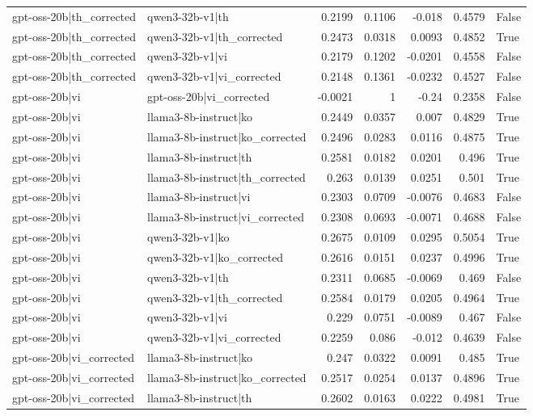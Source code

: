 \begin{table}
\begin{tabular}{l l r r r r l}
gpt-oss-20b|th_corrected & qwen3-32b-v1|th & 0.2199 & 0.1106 & -0.018 & 0.4579 & False \\
gpt-oss-20b|th_corrected & qwen3-32b-v1|th_corrected & 0.2473 & 0.0318 & 0.0093 & 0.4852 & True \\
gpt-oss-20b|th_corrected & qwen3-32b-v1|vi & 0.2179 & 0.1202 & -0.0201 & 0.4558 & False \\
gpt-oss-20b|th_corrected & qwen3-32b-v1|vi_corrected & 0.2148 & 0.1361 & -0.0232 & 0.4527 & False \\
gpt-oss-20b|vi & gpt-oss-20b|vi_corrected & -0.0021 & 1 & -0.24 & 0.2358 & False \\
gpt-oss-20b|vi & llama3-8b-instruct|ko & 0.2449 & 0.0357 & 0.007 & 0.4829 & True \\
gpt-oss-20b|vi & llama3-8b-instruct|ko_corrected & 0.2496 & 0.0283 & 0.0116 & 0.4875 & True \\
gpt-oss-20b|vi & llama3-8b-instruct|th & 0.2581 & 0.0182 & 0.0201 & 0.496 & True \\
gpt-oss-20b|vi & llama3-8b-instruct|th_corrected & 0.263 & 0.0139 & 0.0251 & 0.501 & True \\
gpt-oss-20b|vi & llama3-8b-instruct|vi & 0.2303 & 0.0709 & -0.0076 & 0.4683 & False \\
gpt-oss-20b|vi & llama3-8b-instruct|vi_corrected & 0.2308 & 0.0693 & -0.0071 & 0.4688 & False \\
gpt-oss-20b|vi & qwen3-32b-v1|ko & 0.2675 & 0.0109 & 0.0295 & 0.5054 & True \\
gpt-oss-20b|vi & qwen3-32b-v1|ko_corrected & 0.2616 & 0.0151 & 0.0237 & 0.4996 & True \\
gpt-oss-20b|vi & qwen3-32b-v1|th & 0.2311 & 0.0685 & -0.0069 & 0.469 & False \\
gpt-oss-20b|vi & qwen3-32b-v1|th_corrected & 0.2584 & 0.0179 & 0.0205 & 0.4964 & True \\
gpt-oss-20b|vi & qwen3-32b-v1|vi & 0.229 & 0.0751 & -0.0089 & 0.467 & False \\
gpt-oss-20b|vi & qwen3-32b-v1|vi_corrected & 0.2259 & 0.086 & -0.012 & 0.4639 & False \\
gpt-oss-20b|vi_corrected & llama3-8b-instruct|ko & 0.247 & 0.0322 & 0.0091 & 0.485 & True \\
gpt-oss-20b|vi_corrected & llama3-8b-instruct|ko_corrected & 0.2517 & 0.0254 & 0.0137 & 0.4896 & True \\
gpt-oss-20b|vi_corrected & llama3-8b-instruct|th & 0.2602 & 0.0163 & 0.0222 & 0.4981 & True \\

\end{tabular}
\end{table}
